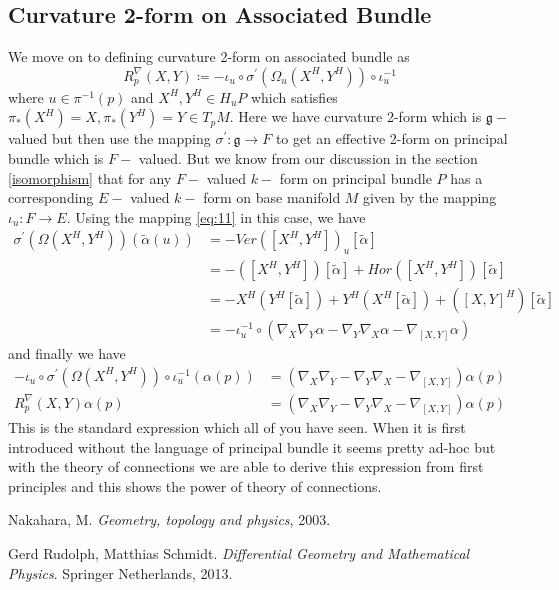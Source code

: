 \documentclass[12pt]{article}
\begin{document}
\subsection{Curvature 2-form on Associated Bundle}
We move on to defining curvature 2-form on associated bundle as
\begin{equation*}
    R^{\nabla}_{p}(X, Y) \coloneqq -\iota_{u}\circ\sigma^{\prime}(\Omega_{u}(X^{H}, Y^{H}))\circ\iota^{-1}_{u}
\end{equation*} where $u\in \pi^{-1}(p)$ and $X^{H}, Y^{H}\in H_{u}P$ which satisfies $\pi_{\ast}(X^{H}) = X, \pi_{\ast}(Y^{H})=Y\in T_{p}M$. Here we have curvature 2-form which is $\mathfrak{g}-$ valued but then use the mapping $\sigma^{\prime}\colon\mathfrak{g}\to F$ to get an effective 2-form on principal bundle which is $F-$ valued. But we know from our discussion in the section \ref{isomorphism} that for any $F-$ valued $k-$ form on principal bundle $P$ has a corresponding $E-$ valued $k-$ form on base manifold $M$ given by the mapping $\iota_{u}\colon F\to E$. Using the mapping \ref{eq:11} in this case, we have
\begin{align*}
    \sigma^{\prime}(\Omega(X^{H}, Y^{H}))(\tilde{\alpha}(u)) &= -Ver([X^{H}, Y^{H}])_{u}[\tilde{\alpha}] \\
                                                             &= -([X^{H}, Y^{H}])[\tilde{\alpha}] + Hor([X^{H}, Y^{H}])[\tilde{\alpha}] \\
                                                             &= -X^{H}(Y^{H}[\tilde{\alpha}]) + Y^{H}(X^{H}[\tilde{\alpha}]) + ([X, Y]^{H})[\tilde{\alpha}] \\
                                                             &= -\iota^{-1}_{u}\circ(\nabla_{X}\nabla_{Y}\alpha - \nabla_{Y}\nabla_{X}\alpha - \nabla_{[X, Y]}\alpha)
\end{align*} and finally we have
\begin{align*}
    -\iota_{u}\circ\sigma^{\prime}(\Omega(X^{H}, Y^{H}))\circ\iota^{-1}_{u}(\alpha(p)) &= (\nabla_{X}\nabla_{Y} - \nabla_{Y}\nabla_{X} - \nabla_{[X, Y]})\alpha(p) \\
            R^{\nabla}_{p}(X, Y)\alpha(p) &= (\nabla_{X}\nabla_{Y} - \nabla_{Y}\nabla_{X} - \nabla_{[X, Y]})\alpha(p)
\end{align*} This is the standard expression which all of you have seen. 
When it is first introduced without the language of principal bundle it seems pretty ad-hoc but with the theory of connections we are able to derive this expression from first principles and this shows the power of theory of connections.

\begin{thebibliography}{9}
Nakahara, M. 
\textit{Geometry, topology and physics}, 2003.

Gerd Rudolph, Matthias Schmidt. 
\textit{Differential Geometry and Mathematical Physics}.
Springer Netherlands, 2013.

\end{thebibliography}
\end{document}
